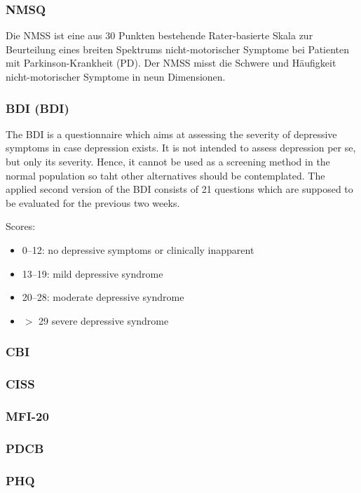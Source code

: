 \documentclass[
	a4paper, 
	11.5pt,
	headings=small, 
	twoside, 
	titlepage=firstiscover, 
 	pagesize=auto,
  	version=last,
	open=any,
	BCOR=14mm,
  	chapterprefix=false]{scrbook}
\begin{document}
\subsubsection{\acl{NMSQ}}
Die NMSS ist eine aus 30 Punkten bestehende Rater-basierte Skala zur Beurteilung eines breiten Spektrums nicht-motorischer Symptome bei Patienten mit Parkinson-Krankheit (PD). Der NMSS misst die Schwere und Häufigkeit nicht-motorischer Symptome in neun Dimensionen.

\subsubsection{\acl{BDI} (\acs{BDI})}
The \ac{BDI} is a questionnaire which aims at assessing the severity of depressive symptoms in case depression exists. It is not intended to assess depression per se, but only its severity. Hence, it cannot be used as a screening method in the normal population so taht other alternatives should be contemplated. The applied second version of the \ac{BDI} consists of  21 questions which are supposed to be evaluated for the previous two weeks. 

Scores:
\begin{itemize}
\item 0–12: no depressive symptoms or clinically inapparent 
\item 13–19: mild depressive syndrome
\item 20–28: moderate depressive syndrome
\item $>$ 29 severe depressive syndrome
\end{itemize}

\subsubsection{\acl{CBI}}
\subsubsection{\acl{CISS}}
\subsubsection{\acl{MFI-20}}
\subsubsection{\acl{PDCB}}
\subsubsection{\acl{PHQ}}
\end{document}
